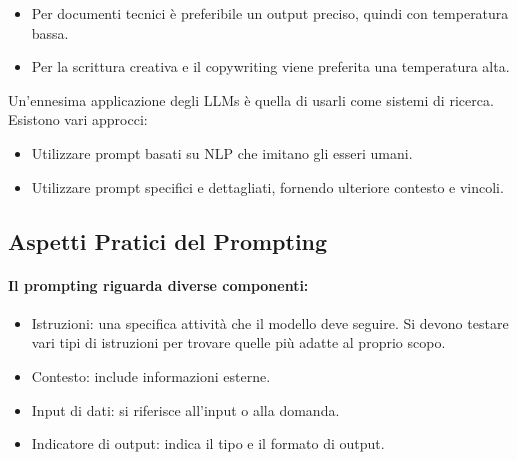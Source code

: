 

\begin{itemize}
  \item Per documenti tecnici è preferibile un output preciso, quindi con temperatura bassa. 
  \item Per la scrittura creativa e il copywriting viene preferita una temperatura alta.
\end{itemize}

Un'ennesima applicazione degli LLMs è quella di usarli come sistemi di ricerca. Esistono vari approcci:

\begin{itemize}
  \item Utilizzare prompt basati su NLP che imitano gli esseri umani. 
  \item Utilizzare prompt specifici e dettagliati, fornendo ulteriore contesto e vincoli. 
\end{itemize}


\subsection{Aspetti Pratici del Prompting}

\paragraph{Il prompting riguarda diverse componenti:}

\begin{itemize}
  \item Istruzioni: una specifica attività che il modello deve seguire. Si devono testare vari tipi di istruzioni per trovare quelle più adatte al proprio scopo.
  \item Contesto: include informazioni esterne. 
  \item Input di dati: si riferisce all'input o alla domanda. 
  \item Indicatore di output: indica il tipo e il formato di output. 
\end{itemize}

